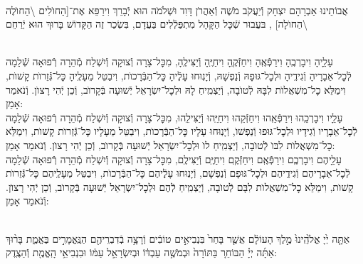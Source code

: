 \documentclass[twoside, openany, parskip=half, 11pt]{book}
\begin{document}
\begin{sometimes}
\\
 אֲבוֹתֵינוּ אַבְרָהָם יִצְחָק וְֿיַעֲקֹב מֹשֶׁה וְֿאַהֲרֹן דָּוִד וּשְׁלֹמֹה הוּא יְֿבָרֵךְ וִירַפֵּא אֶת־[הַחוׂלִים \textbackslash הַחוׂלֶה \textbackslash הַחוׂלָה]
,
בּעֲבוּר שְֿׁכָּל הַקָּהָל מִתְפַּלְֿלִים בַּעֲדָם, בִּשְׂכַר זֶה
 הַקָּדוֹשׁ בָּרוּךְ הוּא יְֿרַחֵם
\setcolumnwidth{1.4in,1.4in,1.4in}
 \begin{paracol}{3}
 \\
 עָלֵָיהָ וִיבָרְכֶֽהָ וִירַפְּֿאֶֽהָ וִיחַזְּֿקֶֽהָ וִיחַיֶּֽהָ וְֿיַצִּילֶֽהָ, מִכׇּל־צָרָה וְֿצוּקָה וְֿיִשְׁלַח מְֿהֵרָה רְֿפוּאָה שְֿׁלֵמָה לְֿכׇל־אֵבָרָיהָ וְֿגִידֶֽיהָ וּלְכׇל־גּוּפָהּ וְֿנַפְשָׁהּ, וְֿיָנֽוּחוּ עָלְֶֿיהָ כׇּל־הַבְּֿרָכוׂת, וִיבַטֵּל מֵעָלֶֽיהָ כׇּל־גְּֿֿזֵרוׂת קָשׁוׂת, וִימַלֵּא כׇל־מִשְׁאֲלוׂת לִבָּהּ לְֿטוׂבָה, וְֿיַצְמִֽיחַ לָהּ וּלְכׇל־יִשְׂרָאֵל יְֿשׁוּעָה בְּֿקָרוׂב, וְֿכֵן יְֿהִי רָצוׂן. וְֿנֹאמַר אָמֵן:
 \switchcolumn
 \\
עָלֵָיו וִיבָרְכֵֽהוּ וִירַפְּֿאֵֽהוּ וִיחַזְּֿקֵהוּ וִיחַיֵּֽהוּ וְֿיַצִּילֵֽהוּ, מִכׇּל־צָרָה וְֿצוּקָה וְֿיִשְׁלַח מְֿהֵרָה רְֿפוּאָה שְֿׁלֵמָה לְֿכׇל־אֵבָרָיו וְֿגִידָיו וּלְכׇל־גּוּפוּ וְֿנַפְשׁוׂ, וְֿיָנֽוּחוּ עָלָיו כׇּל־הַבְּֿרָכוׂת, וִיבַטֵּל מֵעָלָיו כׇּל־גְּֿֿזֵרוׂת קָשׁוׂת, וִימַלֵּא כׇל־מִשְׁאֲלוׂת לִבּוׂ לְֿטוׂבָה, וְֿיַצְמִֽיחַ לוׂ וּלְכׇל־יִשְׂרָאֵל יְֿשׁוּעָה בְּֿקָרוׂב, וְֿכֵן יְֿהִי רָצוׂן. וְֿנֹאמַר אָמֵן:
 \switchcolumn
 \\
 עָלֵָיהֶם וִיבָרְכְֶם וִירַפְּֿאֶֽם וִיחַזְּֿקֶֽם וִיחַיֶּֽם וְֿיַצִּילֶֽם, מִכׇּל־צָרָה וְֿצוּקָה וְֿיִשְׁלַח מְֿהֵרָה רְֿפוּאָה שְֿׁלֵמָה לְֿכׇל־אֵבָרָיהֶם וְֿגִידֶֽיהֶם וּלְכׇל־גּוּפָם וְֿנַפְשָׁם, וְֿיָנֽוּחוּ עָלְֶֿיהֶם כׇּל־הַבְּֿרָכוׂת, וִיבַטֵּל מֵעָלֶֽיהֶם כׇּל־גְּֿֿזֵרוׂת קָשׁוׂת, וִימַלֵּא כׇל־מִשְׁאֲלוׂת לִבָּם לְֿטוׂבָה, וְֿיַצְמִֽיחַ לְֿהֶם וּלְכׇל־יִשְׂרָאֵל יְֿשׁוּעָה בְּֿקָרוׂב, וְֿכֵן יְֿהִי רָצוׂן. וְֿנֹאמַר אָמֵן:
 \end{paracol}

\end{sometimes}

\halfkaddish

\hagbaha
\newpage
{}

\\
 אַתָּ֤ה יְ֙יָ אֱלֹ֙הֵֽינוּ֙ מֶ֣לֶךְ הָעוֹלָ֔ם אֲשֶׁ֤ר בָּחַר֙ בִּנְבִיאִ֣ים טוֹבִ֔ים וְֿרָצָ֥ה בְֿדִבְרֵיהֶ֖ם הַנֶּֽאֱמָרִ֣ים בֶּאֱמֶ֑ת בָּר֨וּךְ אַתָּ֜ה יְיָ֗ הַבּוֹחֵר֚ בַּתּוֹרָה֙ וּבְמֹשֶׁ֣ה עַבְדּ֔וֹ וּבְיִשְׂרָאֵ֣ל עַמּ֔וֹ וּבִנְבִיאֵ֥י הָֽאֱמֶ֖ת וְֿהַצֶֽדֶק:
\end{document}
